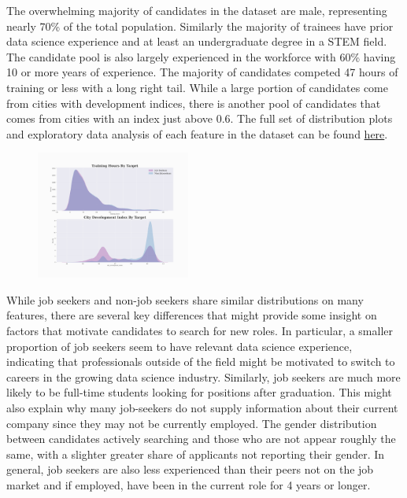 

\vspace{10px}
The overwhelming majority of candidates in the dataset are male, representing nearly 70\% of the total population. Similarly the majority of trainees have prior data science experience and at least an undergraduate degree in a STEM field.  The candidate pool is also largely experienced in the workforce with 60\% having 10 or more years of experience. The majority of candidates competed 47 hours of training or less with a long right tail.  While a large portion of candidates come from cities with development indices, there is another pool of candidates that comes from cities with an index just above 0.6. The full set of distribution plots and exploratory data analysis of each feature in the dataset can be found \href{https://github.com/cas2247/RDS_Algorithmic_Fairness/blob/main/notebooks/1_Input_and_Output.ipynb}{here}.


\begin{figure}
    \centering
    \includegraphics[width=0.45\textwidth]{continuous_distributions_target}
\end{figure}

While job seekers and non-job seekers share similar distributions on many features, there are several key differences that might provide some insight on factors that motivate candidates to search for new roles.  In particular, a smaller proportion of job seekers seem to have relevant data science experience, indicating that professionals outside of the field might be motivated to switch to careers in the growing data science industry.  Similarly, job seekers are much more likely to be full-time students looking for positions after graduation.  This might also explain why many job-seekers do not supply information about their current company since they may not be currently employed. The gender distribution between candidates actively searching and those who are not appear roughly the same, with a slighter greater share of applicants not reporting their gender.  In general, job seekers are also less experienced than their peers not on the job market and if employed, have been in the current role for 4 years or longer. 

